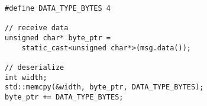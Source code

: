 \documentclass{article}%
\begin{document}
\begin{lstlisting}
#define DATA_TYPE_BYTES 4

// receive data
unsigned char* byte_ptr = 
    static_cast<unsigned char*>(msg.data());

// deserialize 
int width;
std::memcpy(&width, byte_ptr, DATA_TYPE_BYTES);
byte_ptr += DATA_TYPE_BYTES;
\end{lstlisting}
\end{document}
